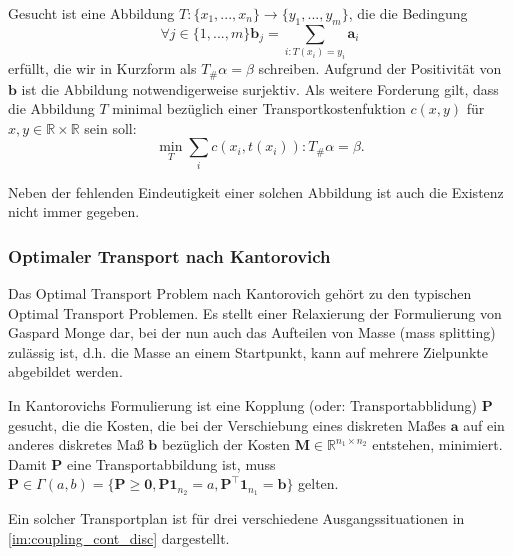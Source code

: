 \documentclass[11pt,a4paper]{article}
\numberwithin{equation}{section}
\begin{document}
	Gesucht ist eine Abbildung $T:\lbrace x_1, ..., x_n \rbrace \to \lbrace y_1,...,y_m \rbrace$, die die Bedingung 
	\begin{equation}
	\forall j \in \lbrace 1,...,m \rbrace \boldsymbol{b}_j= \sum_{i:T(x_i)=y_i}{\boldsymbol{a}_i}
	\end{equation}
	erfüllt, die wir in Kurzform als $T_\#\alpha = \beta$ schreiben. Aufgrund der Positivität von $\boldsymbol{b}$ ist die Abbildung notwendigerweise surjektiv.
	Als weitere Forderung gilt, dass die Abbildung $T$ minimal bezüglich einer Transportkostenfuktion $c(x,y)$ für $x,y \in \mathbb{R} \times \mathbb{R}$ sein soll:
	\begin{equation}
	\min_T{\sum_i{c(x_i, t(x_i)) : T_\#\alpha =  \beta}}.
	\end{equation} 
	
	Neben der fehlenden Eindeutigkeit einer solchen Abbildung ist auch die Existenz nicht immer gegeben.
	
	\subsubsection{Optimaler Transport nach Kantorovich}
	
	Das Optimal Transport Problem nach Kantorovich gehört zu den typischen Optimal Transport Problemen. Es stellt einer Relaxierung der Formulierung von Gaspard Monge dar, bei der nun auch das Aufteilen von Masse (mass splitting) zulässig ist, d.h. die Masse an einem Startpunkt, kann auf mehrere Zielpunkte abgebildet werden.
	
	In Kantorovichs Formulierung ist eine Kopplung (oder: Transportabblidung) $\boldsymbol{P}$ gesucht, die die Kosten, die bei der Verschiebung eines diskreten Maßes $\boldsymbol{a}$ auf ein anderes diskretes Maß $\boldsymbol{b}$ bezüglich der Kosten $\boldsymbol{M} \in \mathbb{R}^{n_1 \times n_2}$ entstehen, minimiert.
	Damit $\boldsymbol{P}$ eine Transportabbildung ist, muss $\boldsymbol{P} \in \Gamma(a,b) = \lbrace \boldsymbol{P} \geq \boldsymbol{0}, \boldsymbol{P}\boldsymbol{1}_{n_2} = a, \boldsymbol{P}^\top\boldsymbol{1}_{n_1} = \boldsymbol{b} \rbrace$ gelten.
	
	Ein solcher Transportplan ist für drei verschiedene Ausgangssituationen in \autoref{im:coupling_cont_disc} dargestellt.
	
\end{document}
